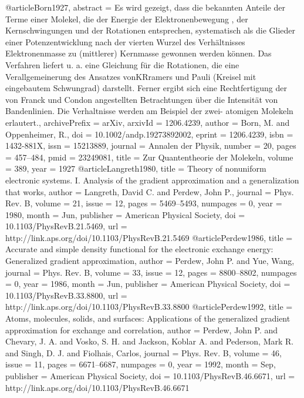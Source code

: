 @article{Born1927,
abstract = {Es wird gezeigt, dass die bekannten Anteile der Terme einer Molekel, die der Energie der Elektronenbewegung , der Kernschwingungen und der Rotationen entsprechen, systematisch als die Glieder einer Potenzentwicklung nach der vierten Wurzel des Verh{\"{a}}ltnisses Elektronenmasse zu (mittlerer) Kernmasse gewonnen werden k{\"{o}}nnen. Das Verfahren liefert u. a. eine Gleichung f{\"{u}}r die Rotationen, die eine Verallgemeinerung des Ansatzes vonKRramers und Pauli (Kreisel mit eingebautem Schwungrad) darstellt. Ferner ergibt sich eine Rechtfertigung der von Franck und Condon angestellten Betrachtungen {\"{u}}ber die Intensit{\"{a}}t von Bandenlinien. Die Verhaltnisse werden am Beispiel der zwei- atomigen Molekeln erlautert.},
archivePrefix = {arXiv},
arxivId = {1206.4239},
author = {Born, M. and Oppenheimer, R.},
doi = {10.1002/andp.19273892002},
eprint = {1206.4239},
isbn = {1432-881X},
issn = {15213889},
journal = {Annalen der Physik},
number = {20},
pages = {457--484},
pmid = {23249081},
title = {{Zur Quantentheorie der Molekeln}},
volume = {389},
year = {1927}
}
@article{Langreth1980,
  title = {Theory of nonuniform electronic systems. I. Analysis of the gradient approximation and a generalization that works},
  author = {Langreth, David C. and Perdew, John P.},
  journal = {Phys. Rev. B},
  volume = {21},
  issue = {12},
  pages = {5469--5493},
  numpages = {0},
  year = {1980},
  month = {Jun},
  publisher = {American Physical Society},
  doi = {10.1103/PhysRevB.21.5469},
  url = {http://link.aps.org/doi/10.1103/PhysRevB.21.5469}
}
@article{Perdew1986,
  title = {Accurate and simple density functional for the electronic exchange energy: Generalized gradient approximation},
  author = {Perdew, John P. and Yue, Wang},
  journal = {Phys. Rev. B},
  volume = {33},
  issue = {12},
  pages = {8800--8802},
  numpages = {0},
  year = {1986},
  month = {Jun},
  publisher = {American Physical Society},
  doi = {10.1103/PhysRevB.33.8800},
  url = {http://link.aps.org/doi/10.1103/PhysRevB.33.8800}
}
@article{Perdew1992,
  title = {Atoms, molecules, solids, and surfaces: Applications of the generalized gradient approximation for exchange and correlation},
  author = {Perdew, John P. and Chevary, J. A. and Vosko, S. H. and Jackson, Koblar A. and Pederson, Mark R. and Singh, D. J. and Fiolhais, Carlos},
  journal = {Phys. Rev. B},
  volume = {46},
  issue = {11},
  pages = {6671--6687},
  numpages = {0},
  year = {1992},
  month = {Sep},
  publisher = {American Physical Society},
  doi = {10.1103/PhysRevB.46.6671},
  url = {http://link.aps.org/doi/10.1103/PhysRevB.46.6671}
}
